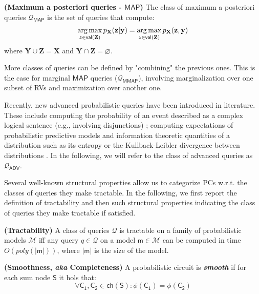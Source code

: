 \begin{definition}{\textbf{(Maximum a posteriori queries - $\mathsf{MAP}$)}}
\label{def:map}
The class of maximum a posteriori queries $\boldsymbol{\mathcal{Q}}_{\mathsf{MAP}}$ is the set of queries that compute:
\begin{align*}
	\operatorname*{arg\,max}_{z \in \mathsf{val}(\mathbf{Z})} p_{\mathbf{X}}(\mathbf{z}|\mathbf{y}) = \operatorname*{arg\,max}_{z \in \mathsf{val}(\mathbf{Z})} p_{\mathbf{X}}(\mathbf{z},\mathbf{y})
\end{align*}
where $\mathbf{Y} \cup \mathbf{Z} = \mathbf{X}$ and $\mathbf{Y} \cap \mathbf{Z} = \varnothing$.
\end{definition}
More classes of queries can be defined by "combining" the previous ones.
This is the case for marginal $\mathsf{MAP}$ queries ($\boldsymbol{\mathcal{Q}}_{\mathsf{MMAP}}$), involving marginalization over one subset of RVs and maximization over another one.

Recently, new advanced probabilistic queries have been introduced in literature.
These  include  computing  the  probability  of  an  event  described  as  a  complex logical sentence (e.g., involving disjunctions) \cite{choi2015tractable}; computing expectations of probabilistic predictive models \cite{khosravi2019tractable} and information theoretic quantities of a distribution such as its entropy or the Kullback-Leibler divergence between distributions \cite{liang2017towards}.
In the following, we will refer to the class of advanced queries as $\boldsymbol{\mathcal{Q}}_{\mathsf{ADV}}$.

Several well-known structural properties allow us to categorize PCs w.r.t. the classes of queries they make tractable.
In the following, we first report the definition of tractability and then such structural properties indicating the class of queries they make tractable if satisfied.

\begin{definition}{\textbf{(Tractability)}}
A class of queries $\boldsymbol{\mathcal{Q}}$ is tractable on a family of probabilistic models $\mathcal{M}$ iff any query $q \in \boldsymbol{\mathcal{Q}}$ on a model $\mathsf{m} \in \mathcal{M}$ can be computed in time $O(poly(|\mathsf{m}|))$, where $|\mathsf{m}|$ is the size of the model.
\end{definition}

\begin{definition}{\textbf{(Smoothness, \textit{aka} Completeness)}}
A probabilistic circuit is \textbf{\textit{smooth}} if for each sum node $\mathsf{S}$ it hols that:
\begin{equation}\label{eq:completeness}
\forall \mathsf{C_1},\mathsf{C_2} \in \mathsf{ch}(\mathsf{S}) : \phi(\mathsf{C_1}) = \phi(\mathsf{C_2})
\end{equation}
\end{definition}

